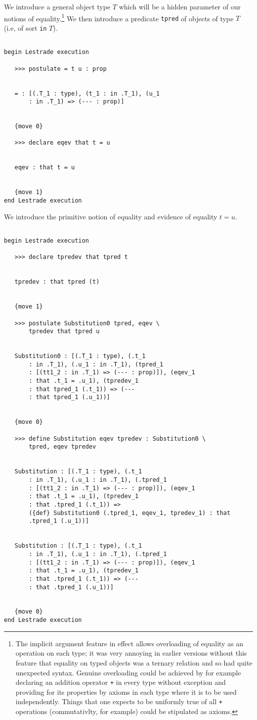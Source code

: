 \documentclass[12pt]{article}
\begin{document}
We introduce a general object type $T$ which will be a hidden parameter of our notions of equality.\footnote{The implicit argument feature in effect allows overloading of equality as an operation on each type;  it was very annoying in earlier versions without this feature that equality on typed objects was a ternary relation and so had quite unexpected syntax.  Genuine overloading could be achieved by for example declaring an addition operator {\tt +} in every type without exception and providing for its properties by axioms in each type where it is to be used independently.  Things that one expects to be uniformly true of all {\tt +} operations (commutativlty, for example) could be stipulated as axioms.}  We then introduce  a predicate {\tt tpred} of objects of type $T$ (i.e, of sort {\tt in} $T$).  

\begin{verbatim}

begin Lestrade execution

   >>> postulate = t u : prop


   = : [(.T_1 : type), (t_1 : in .T_1), (u_1 
       : in .T_1) => (--- : prop)]


   {move 0}

   >>> declare eqev that t = u


   eqev : that t = u


   {move 1}
end Lestrade execution
\end{verbatim}

We introduce the primitive notion of equality and evidence of equality $t=u$.

\begin{verbatim}

begin Lestrade execution

   >>> declare tpredev that tpred t


   tpredev : that tpred (t)


   {move 1}

   >>> postulate Substitution0 tpred, eqev \
       tpredev that tpred u


   Substitution0 : [(.T_1 : type), (.t_1 
       : in .T_1), (.u_1 : in .T_1), (tpred_1 
       : [(tt1_2 : in .T_1) => (--- : prop)]), (eqev_1 
       : that .t_1 = .u_1), (tpredev_1 
       : that tpred_1 (.t_1)) => (--- 
       : that tpred_1 (.u_1))]


   {move 0}

   >>> define Substitution eqev tpredev : Substitution0 \
       tpred, eqev tpredev


   Substitution : [(.T_1 : type), (.t_1 
       : in .T_1), (.u_1 : in .T_1), (.tpred_1 
       : [(tt1_2 : in .T_1) => (--- : prop)]), (eqev_1 
       : that .t_1 = .u_1), (tpredev_1 
       : that .tpred_1 (.t_1)) => 
       ({def} Substitution0 (.tpred_1, eqev_1, tpredev_1) : that 
       .tpred_1 (.u_1))]


   Substitution : [(.T_1 : type), (.t_1 
       : in .T_1), (.u_1 : in .T_1), (.tpred_1 
       : [(tt1_2 : in .T_1) => (--- : prop)]), (eqev_1 
       : that .t_1 = .u_1), (tpredev_1 
       : that .tpred_1 (.t_1)) => (--- 
       : that .tpred_1 (.u_1))]


   {move 0}
end Lestrade execution
\end{verbatim}
\end{document}
